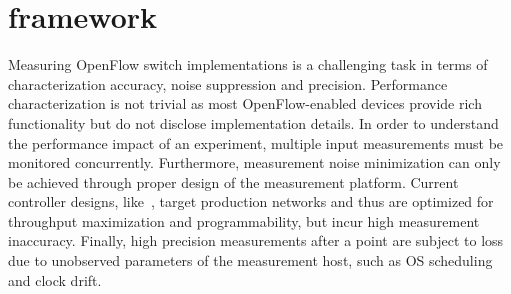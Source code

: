 

\section{\oflops framework}\label{sec:design}
\label{sec:architecture}




Measuring OpenFlow switch implementations is a challenging task in terms 
of characterization accuracy, noise suppression and precision. 
Performance characterization is not trivial as most OpenFlow-enabled devices 
provide rich functionality but do not disclose implementation details. In order
to understand the performance impact of an experiment, multiple input 
measurements must be monitored concurrently. Furthermore, measurement noise
minimization can only be achieved through proper design of the measurement platform. 
Current controller designs, like~\cite{Gude08,SNAC}, target production networks
and thus are optimized for throughput maximization and programmability, 
but incur high measurement inaccuracy. Finally, high precision 
measurements after a point are subject to loss due to unobserved parameters 
of the measurement host, such as OS scheduling and clock drift. 
%

